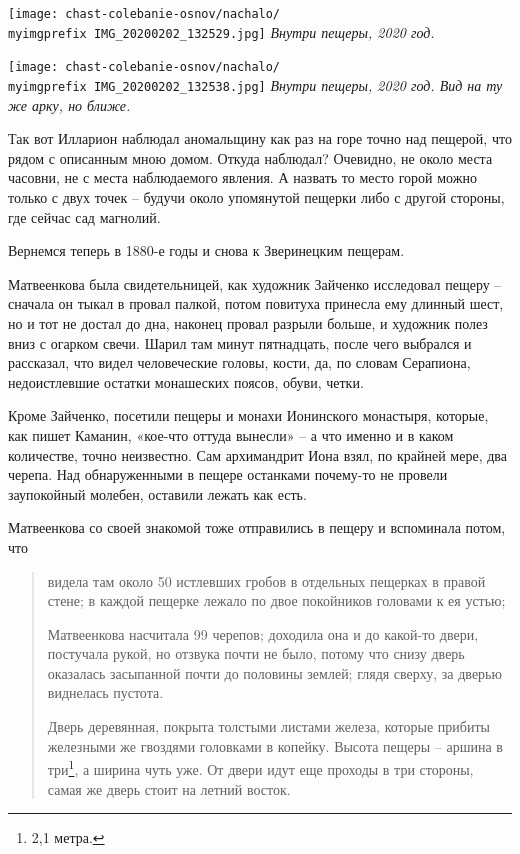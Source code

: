 \vspace*{\fill}
\begin{center}
\texttt{[image: chast-colebanie-osnov/nachalo/\\myimgprefix IMG\_20200202\_132529.jpg]}
\textit{Внутри пещеры, 2020 год.}
\end{center}
\vspace*{\fill}

\newpage
\vspace*{\fill}
\begin{center}
\texttt{[image: chast-colebanie-osnov/nachalo/\\myimgprefix IMG\_20200202\_132538.jpg]}
\textit{Внутри пещеры, 2020 год. Вид на ту же арку, но ближе.}
\end{center}
\vspace*{\fill}
\newpage

Так вот Илларион наблюдал аномальщину как раз на горе точно над пещерой, что рядом с описанным мною домом. Откуда наблюдал? Очевидно, не около места часовни, не с места наблюдаемого явления. А назвать то место горой можно только с двух точек – будучи около упомянутой пещерки либо с другой стороны, где сейчас сад магнолий.

Вернемся теперь в 1880-е годы и снова к Зверинецким пещерам. 

Матвеенкова была свидетельницей, как художник Зайченко исследовал пещеру – сначала он тыкал в провал палкой, потом повитуха принесла ему длинный шест, но и тот не достал до дна, наконец провал разрыли больше, и художник полез вниз с огарком свечи. Шарил там минут пятнадцать, после чего выбрался и рассказал, что видел человеческие головы, кости, да, по словам Серапиона, недоистлевшие остатки монашеских поясов, обуви, четки.


Кроме Зайченко, посетили пещеры и монахи Ионинского монастыря, которые, как пишет Каманин, «кое-что оттуда вынесли» – а что именно и в каком количестве, точно неизвестно. Сам архимандрит Иона взял, по крайней мере, два черепа. Над обнаруженными в пещере останками почему-то не провели заупокойный молебен, оставили лежать как есть.

Матвеенкова со своей знакомой тоже отправились в пещеру и вспоминала потом, что

\begin{quotation}
видела там около 50 истлевших гробов в отдельных пещерках в правой стене; в каждой пещерке лежало по двое покойников головами к ея устью;

Матвеенкова насчитала 99 черепов; доходила она и до какой-то двери, постучала рукой, но отзвука почти не было, потому что снизу дверь оказалась засыпанной почти до половины землей; глядя сверху, за дверью виднелась пустота.

Дверь деревянная, покрыта толстыми листами железа, которые прибиты железными же гвоздями головками в копейку. Высота пещеры – аршина в три\footnote{2,1 метра.}, а ширина чуть уже. От двери идут еще проходы в три стороны, самая же дверь стоит на летний восток.
\end{quotation}

